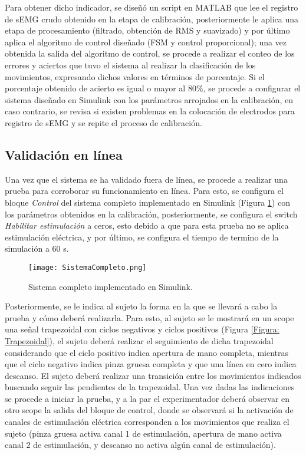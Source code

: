 Para obtener dicho indicador, se diseñó un script en MATLAB que lee el registro de sEMG crudo obtenido en la etapa de calibración, posteriormente le aplica una etapa de procesamiento (filtrado, obtención de RMS y suavizado) y por último aplica el algoritmo de control diseñado (FSM y control proporcional); una vez obtenida la salida del algoritmo de control, se procede a realizar el conteo de los errores y aciertos que tuvo el sistema al realizar la clasificación de los movimientos, expresando dichos valores en términos de porcentaje. Si el porcentaje obtenido de acierto es igual o mayor al 80$\%$, se procede a configurar el sistema diseñado en Simulink con los parámetros arrojados en la calibración, en caso contrario, se revisa si existen problemas en la colocación de electrodos para registro de sEMG y se repite el proceso de calibración.

\newpage
\subsection{Validación en línea}
Una vez que el sistema se ha validado fuera de línea, se procede a realizar una prueba para corroborar su funcionamiento en línea. Para esto, se configura el bloque \emph{Control} del sistema completo implementado en Simulink (Figura \ref{Figura: SisComp}) con los parámetros obtenidos en la calibración, posteriormente, se configura el switch \emph{Habilitar estimulación} a ceros, esto debido a que para esta prueba no se aplica estimulación eléctrica, y por último, se configura el tiempo de termino de la simulación a 60 s.

\begin{figure}[htbp]
	\centering
	\texttt{[image: SistemaCompleto.png]}
	\caption{Sistema completo implementado en Simulink.}
	\label{Figura: SisComp}
\end{figure}

Posteriormente, se le indica al sujeto la forma en la que se llevará a cabo la prueba y cómo deberá realizarla. Para esto, al sujeto se le mostrará en un scope una señal trapezoidal con ciclos negativos y ciclos positivos (Figura \ref{Figura: Trapezoidal}), el sujeto deberá realizar el seguimiento de dicha trapezoidal considerando que el ciclo positivo indica apertura de mano completa, mientras que el ciclo negativo indica pinza gruesa completa y que una línea en cero indica descanso. El sujeto deberá realizar una transición entre los movimientos indicados buscando seguir las pendientes de la trapezoidal. Una vez dadas las indicaciones se procede a iniciar la prueba, y a la par el experimentador deberá observar en otro scope la salida del bloque de control, donde se observará si la activación de canales de estimulación eléctrica corresponden a los movimientos que realiza el sujeto (pinza gruesa activa canal 1 de estimulación, apertura de mano activa canal 2 de estimulación, y descanso no activa algún canal de estimulación).

